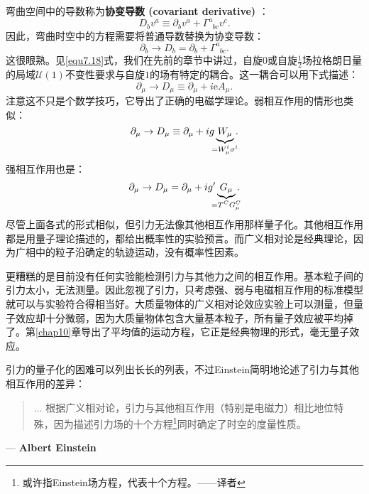 弯曲空间中的导数称为{\bfseries 协变导数 (covariant derivative)}%
%
：
\begin{equation}
\label{equ12.10}
    D_b v^a \equiv \partial_b v^a + \Gamma^a_{\phantom{a}bc} v^c.
\end{equation}
因此，弯曲时空中的方程需要将普通导数替换为协变导数：
\begin{equation}
\label{equ12.11}
    \partial_b \to D_b = \partial_b + \Gamma^a_{\phantom{a}bc}.
\end{equation}
这很眼熟。见\ref{equ7.18}式，我们在先前的章节中讲过，自旋$0$或自旋$\frac{1}{2}$场拉格朗日量的局域$\mathcal{U}(1)$不变性要求与自旋$1$的场有特定的耦合。这一耦合可以用下式描述：
\begin{equation}
\label{equ12.12}
    \partial_\mu \to D_\mu \equiv \partial_\mu + i \mathrm{e} A_\mu.
\end{equation}
注意这不只是个数学技巧，它导出了正确的电磁学理论。弱相互作用的情形也类似：
\begin{equation}
\label{equ12.13}
    \partial_\mu \to D_\mu \equiv \partial_\mu + i g \underbrace{W_\mu}_{\mathclap{= W_\mu^i \sigma^i}}.
\end{equation}
强相互作用也是：
\begin{equation}
\label{equ12.14}
    \partial_\mu \to D_\mu = \partial_\mu + i g' \underbrace{G_\mu}_{\mathclap{= T^C G^C_\mu}}.
\end{equation}
尽管上面各式的形式相似，但引力无法像其他相互作用那样量子化。其他相互作用都是用量子理论描述的，都给出概率性的实验预言。而广义相对论是经典理论，因为广相中的粒子沿确定的轨迹运动，没有概率性因素。

更糟糕的是目前没有任何实验能检测引力与其他力之间的相互作用。基本粒子间的引力太小，无法测量。因此忽视了引力，只考虑强、弱与电磁相互作用的标准模型就可以与实验符合得相当好。大质量物体的广义相对论效应实验上可以测量，但量子效应却十分微弱，因为大质量物体包含大量基本粒子，所有量子效应被平均掉了。第\ref{chap10}章导出了平均值的运动方程，它正是经典物理的形式，毫无量子效应。

引力的量子化的困难可以列出长长的列表，不过Einstein简明地论述了引力与其他相互作用的差异：
\begin{quote}
$\dots$ 根据广义相对论，引力与其他相互作用（特别是电磁力）相比地位特殊，因为描述引力场的十个方程\footnote{或许指Einstein场方程，代表十个方程。——译者}同时确定了时空的度量性质。
\end{quote}
\begin{flushright}
--- {\bfseries Albert Einstein}
\end{flushright}

